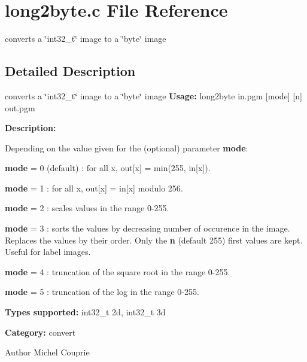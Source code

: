 \section{long2byte.c File Reference}
\label{long2byte_8c}


converts a \char`\"{}int32\_\-t\char`\"{} image to a \char`\"{}byte\char`\"{} image  




\subsection{Detailed Description}
converts a \char`\"{}int32\_\-t\char`\"{} image to a \char`\"{}byte\char`\"{} image {\bfseries Usage:} long2byte in.pgm [mode] [n] out.pgm

{\bfseries Description:}

Depending on the value given for the (optional) parameter {\bfseries mode}: \begin{DoxyItemize}
\item {\bfseries mode} = 0 (default) : for all x, out[x] = min(255, in[x]). \item {\bfseries mode} = 1 : for all x, out[x] = in[x] modulo 256. \item {\bfseries mode} = 2 : scales values in the range 0-\/255. \item {\bfseries mode} = 3 : sorts the values by decreasing number of occurence in the image. Replaces the values by their order. Only the {\bfseries n} (default 255) first values are kept. Useful for label images. \item {\bfseries mode} = 4 : truncation of the square root in the range 0-\/255. \item {\bfseries mode} = 5 : truncation of the log in the range 0-\/255.\end{DoxyItemize}
{\bfseries Types supported:} int32\_\-t 2d, int32\_\-t 3d

{\bfseries Category:} convert

\begin{DoxyAuthor}{Author}
Michel Couprie 
\end{DoxyAuthor}

